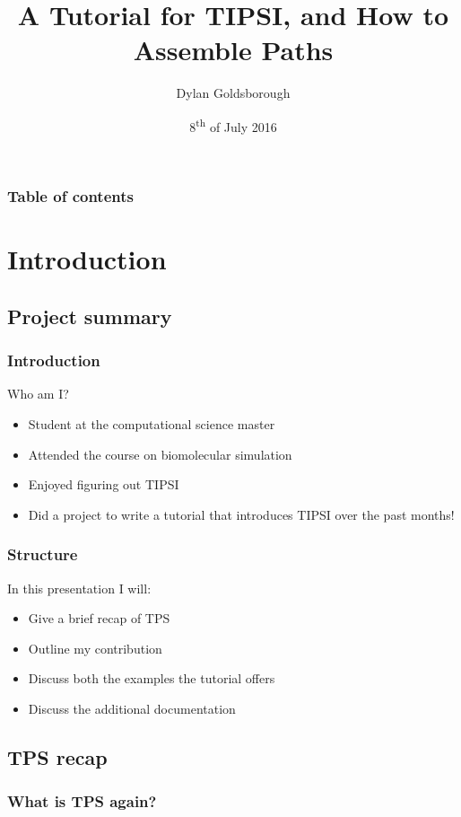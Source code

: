 \documentclass[hyperref={pdfpagelabels=false}]{beamer}
\title{A Tutorial for \textsc{TIPSI}, and How to Assemble Paths}
\author{Dylan Goldsborough}
\date{8\textsuperscript{th} of July 2016}
\begin{document}
\begin{frame}
\titlepage
\end{frame} 

\begin{frame}
\frametitle{Table of contents}
\tableofcontents
\end{frame} 


\section{Introduction} 
\subsection{Project summary}
\begin{frame}
\frametitle{Introduction}
Who am I?
\begin{itemize}
\item Student at the computational science master
\item Attended the course on biomolecular simulation
\item Enjoyed figuring out \textsc{TIPSI}
\item Did a project to write a tutorial that introduces \textsc{TIPSI} over the past months!
\end{itemize}
\end{frame}

\begin{frame}
\frametitle{Structure}
In this presentation I will:
\begin{itemize}
\item Give a brief recap of TPS
\item Outline my contribution
\item Discuss both the examples the tutorial offers
\item Discuss the additional documentation
\end{itemize} 
\end{frame}

\subsection{TPS recap}
\begin{frame}
\frametitle{What is TPS again?} 
\end{frame}
\end{document}
